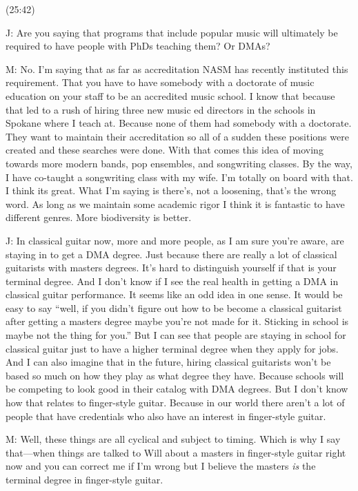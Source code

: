 \documentclass[11pt]{article}
\begin{document}
(25:42)

J: Are you saying that programs that include popular music will ultimately be required to have people with PhDs teaching them? Or DMAs?

M: No. I'm saying that as far as accreditation NASM has recently instituted this requirement. That you have to have somebody with a doctorate of music education on your staff to be an accredited music school. I know that because that led to a rush of hiring three new music ed directors in the schools in Spokane where I teach at. Because none of them had somebody with a doctorate. They want to maintain their accreditation so all of a sudden these positions were created and these searches were done. With that comes this idea of moving towards more modern bands, pop ensembles, and songwriting classes. By the way, I have co-taught a songwriting class with my wife. I'm totally on board with that. I think its great. What I'm saying is there's, not a loosening, that's the wrong word. As long as we maintain some academic rigor I think it is fantastic to have different genres. More biodiversity is better. 

J: In classical guitar now, more and more people, as I am sure you're aware, are staying in to get a DMA degree. Just because there are really a lot of classical guitarists with masters degrees. It's hard to distinguish yourself if that is your terminal degree. And I don't know if I see the real health in getting a DMA in classical guitar performance. It seems like an odd idea in one sense. It would be easy to say ``well, if you didn't figure out how to be become a classical guitarist after getting a masters degree maybe you're not made for it. Sticking in school is maybe not the thing for you.'' But I can see that people are staying in school for classical guitar just to have a higher terminal degree when they apply for jobs. And I can also imagine that in the future, hiring classical guitarists won't be based so much on how they play as what degree they have. Because schools will be competing to look good in their catalog with DMA degrees. But I don't know how that relates to finger-style guitar.  Because in our world there aren't a lot of people that have credentials who also have an interest in finger-style guitar. 

M: Well, these things are all cyclical and subject to timing. Which is why I say that—when things are talked to Will about a masters in finger-style guitar right now and you can correct me if I'm wrong but I believe the masters \emph{is} the terminal degree in finger-style guitar.
\end{document}
